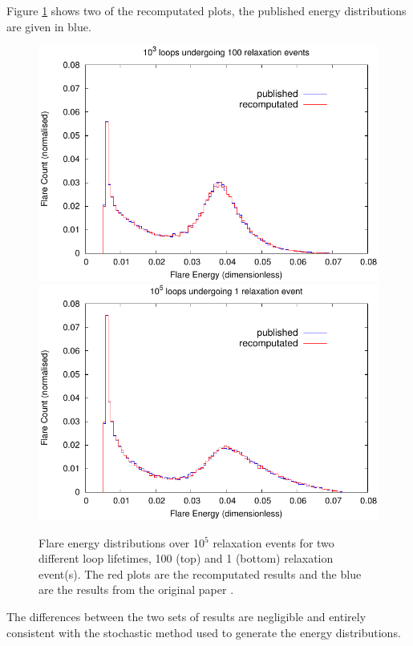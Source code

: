 Figure \ref{fig_recomp_grp3_exp2} shows two of the recomputated plots, the published energy distributions 
  \cite{bareford2010nanoflare} are given in blue.
\begin{figure}
\begin{minipage}{\linewidth} 
  \center
  \includegraphics{../Group_3/wrpf_rx10e5_lle2}\\
  \vspace{5pt}
  \includegraphics[scale=0.001]{../Group_3/wrpf_rx10e5_lle0}
  \caption{\small{Flare energy distributions over 10$^5$ relaxation events for two different loop lifetimes, 100 (top) and 1 (bottom) relaxation event(s). The red plots are the recomputated results and the blue are the results from the original paper \cite{bareford2010nanoflare}.}}
  \label{fig_recomp_grp3_exp2}
\end{minipage} 
\end{figure}
The differences between the two sets of results are negligible and entirely consistent with the stochastic method used to generate the energy distributions.

